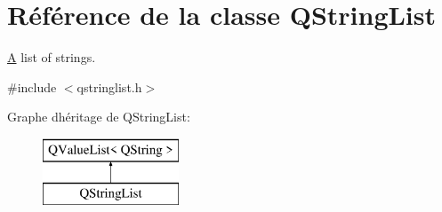 \hypertarget{class_q_string_list}{}\section{Référence de la classe Q\+String\+List}
\label{class_q_string_list}


\hyperlink{class_a}{A} list of strings.  




{\ttfamily \#include $<$qstringlist.\+h$>$}

Graphe d\textquotesingle{}héritage de Q\+String\+List\+:\begin{figure}[H]
\begin{center}
\leavevmode
\includegraphics[height=2.000000cm]{class_q_string_list}
\end{center}
\end{figure}
